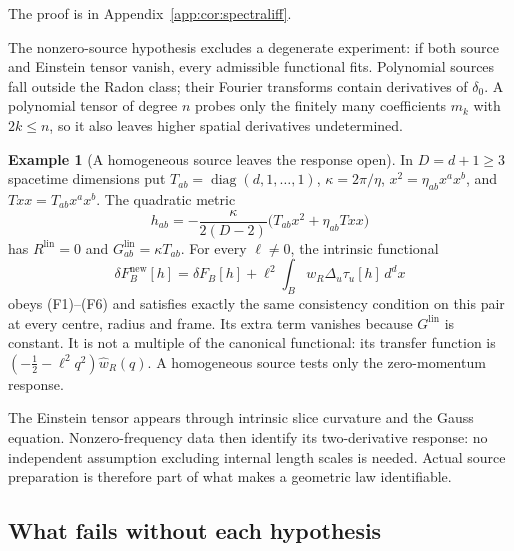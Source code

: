 \documentclass[12pt]{article}
\theoremstyle{definition}
\newtheorem{example}[theorem]{Example}
\theoremstyle{remark}
\newcommand{\Glin}{G^{\mathrm{lin}}}
\begin{document}
The proof is in Appendix~\ref{app:cor:spectraliff}.


The nonzero-source hypothesis excludes a degenerate experiment: if both source and
Einstein tensor vanish, every admissible functional fits. Polynomial sources fall
outside the Radon class; their Fourier transforms contain derivatives of \(\delta_0\).
A polynomial tensor of degree \(n\) probes only the finitely many coefficients
\(m_k\) with \(2k\le n\), so it also leaves higher spatial derivatives undetermined.

\begin{example}[A homogeneous source leaves the response open]\label{ex:homogeneous}
In \(D=d+1\ge3\) spacetime dimensions put
\(T_{ab}=\operatorname{diag}(d,1,\ldots,1)\), \(\kappa=2\pi/\eta\),
\(x^2=\eta_{ab}x^ax^b\), and \(Txx=T_{ab}x^ax^b\). The quadratic metric
\[
h_{ab}=-\frac{\kappa}{2(D-2)}\bigl(T_{ab}x^2+\eta_{ab}Txx\bigr)
\]
has \(R^{\mathrm{lin}}=0\) and \(\Glin_{ab}=\kappa T_{ab}\).
For every \(\ell\ne0\), the intrinsic functional
\[
\delta F^{\mathrm{new}}_B[h]=\delta F_B[h]
+\ell^2\int_Bw_R\Delta_u\tau_u[h]\,d^dx
\]
obeys (F1)--(F6) and satisfies exactly the same consistency condition on this
pair at every centre, radius and frame. Its extra term vanishes because
\(\Glin\) is constant. It is not a multiple of the canonical functional:
its transfer function is \((-\tfrac12-\ell^2q^2)\widehat w_R(q)\).
A homogeneous source tests only the zero-momentum response.
\end{example}

The Einstein tensor appears through intrinsic slice curvature and the Gauss equation.
Nonzero-frequency data then identify its two-derivative response: no independent
assumption excluding internal length scales is needed. Actual source preparation is
therefore part of what makes a geometric law identifiable.

\subsection{What fails without each hypothesis}\label{subsec:failures}
\end{document}
